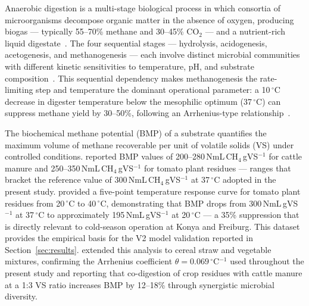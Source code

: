\hspace{1cm}Anaerobic digestion is a multi-stage biological process in
which consortia of microorganisms decompose organic matter in the absence
of oxygen, producing biogas --- typically 55--70\% methane and 30--45\%
CO$_2$ --- and a nutrient-rich liquid digestate~\citep{angelidaki_defining_2009,mata-alvarez_critical_2014}. The four sequential stages --- hydrolysis, acidogenesis,
acetogenesis, and methanogenesis --- each involve distinct microbial
communities with different kinetic sensitivities to temperature, pH, and
substrate composition~\citep{alengebawy2024}. This sequential dependency
makes methanogenesis the rate-limiting step and temperature the dominant
operational parameter: a 10\,$^{\circ}$C decrease in digester temperature
below the mesophilic optimum (37\,$^{\circ}$C) can suppress methane yield
by 30--50\%, following an Arrhenius-type relationship~\citep{lindorfer2008}.
 
The biochemical methane potential (BMP) of a substrate quantifies the
maximum volume of methane recoverable per unit of volatile solids (VS)
under controlled conditions. \citet{lallement2023} reported BMP values
of 200--280\,NmL\,CH$_4$\,gVS$^{-1}$ for cattle manure and
250--350\,NmL\,CH$_4$\,gVS$^{-1}$ for tomato plant residues --- ranges
that bracket the reference value of 300\,NmL\,CH$_4$\,gVS$^{-1}$ at
37\,$^{\circ}$C adopted in the present study. \citet{feng2013} provided
a five-point temperature response curve for tomato plant residues from
20\,$^{\circ}$C to 40\,$^{\circ}$C, demonstrating that BMP drops from
300\,NmL\,gVS$^{-1}$ at 37\,$^{\circ}$C to approximately
195\,NmL\,gVS$^{-1}$ at 20\,$^{\circ}$C --- a 35\% suppression that is
directly relevant to cold-season operation at Konya and Freiburg. This
dataset provides the empirical basis for the V2 model validation reported
in Section~\ref{sec:results}. \citet{pilarski2025} extended this analysis
to cereal straw and vegetable mixtures, confirming the Arrhenius coefficient
$\theta = 0.069$\,$^{\circ}$C$^{-1}$ used throughout the present study and
reporting that co-digestion of crop residues with cattle manure at a 1:3
VS ratio increases BMP by 12--18\% through synergistic microbial diversity.
 
